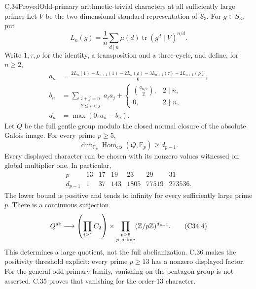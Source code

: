 \begin{statement}{C.34}{Proved}{Odd-primary arithmetic-trivial characters at all sufficiently large primes}
Let $V$ be the two-dimensional standard representation of $S_3$.
For $g\in S_3$, put
\[
 L_n(g)=\frac1n\sum_{d\mid n}\mu(d)
                   \operatorname{tr}(g^d\mid V)^{n/d}.
\]
Write $1,\tau,\rho$ for the identity, a transposition and a
three-cycle, and define, for $n\geq2$,
\[
\begin{split}
 a_n&=\frac{2L_n(1)-L_{n+1}(1)-2L_n(\rho)
                 -3L_{n+1}(\tau)-2L_{n+1}(\rho)}6,\\
 b_n&=\sum_{\substack{i+j=n\\2\leq i<j}}a_i a_j
              +\begin{cases}\binom{a_{n/2}}2,&2\mid n,\\0,&2\nmid n,\end{cases}\\
 d_n&=\max(0,a_n-b_n).
\end{split}                                                     \tag{C34.1}
\]
Let $Q$ be the full gentle group modulo the closed normal closure
of the absolute Galois image.  For every prime $p\geq5$,
\[
 \dim_{\mathbb F_p}\operatorname{Hom}_{\mathrm{cts}}(Q,\mathbb F_p)
                       \geq d_{p-1}.                            \tag{C34.2}
\]
Every displayed character can be chosen with its nonzero values
witnessed on global multiplier one.  In particular,
\[
\begin{array}{c|rrrrrr}
 p&13&17&19&23&29&31\\ \hline
 d_{p-1}&1&37&143&1805&77519&273536 .
\end{array}                                                     \tag{C34.3}
\]
The lower bound is positive and tends to infinity for every
sufficiently large prime $p$.  There is a continuous surjection
\[
 Q^{\mathrm{ab}}\longrightarrow
 \left(\prod_{j\geq1}C_2\right)
       \times\prod_{\substack{p\geq5\\p\ {\rm prime}}}
                         (\mathbb Z/p\mathbb Z)^{d_{p-1}} .
                                                               \tag{C34.4}
\]
This determines a large quotient, not the full abelianization.
C.36 makes the positivity threshold explicit: every prime
$p\geq13$ has a nonzero displayed factor.
For the general odd-primary family, vanishing on the pentagon
group is not asserted.  C.35 proves that vanishing for the
order-$13$ character.
\end{statement}
